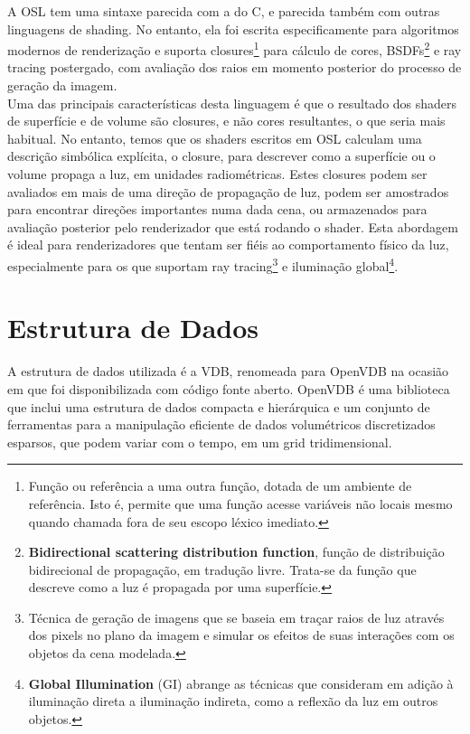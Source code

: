 \documentclass[12pt, a4paper, oneside]{book}
\begin{document}
A OSL tem uma sintaxe parecida com a do C, e parecida também com outras linguagens de shading. No entanto, ela foi escrita especificamente para algoritmos modernos de renderização e suporta closures\footnote{Função ou referência a uma outra função, dotada de um ambiente de referência. Isto é, permite que uma função acesse variáveis não locais mesmo quando chamada fora de seu escopo léxico imediato.} para cálculo de cores, BSDFs\footnote{{\bf Bidirectional scattering distribution function}, função de distribuição bidirecional de propagação, em tradução livre. Trata-se da função que descreve como a luz é propagada por uma superfície.} e ray tracing postergado, com avaliação dos raios em momento posterior do processo de geração da imagem. \\

Uma das principais características desta linguagem é que o resultado dos shaders de superfície e de volume são closures, e não cores resultantes, o que seria mais habitual.
No entanto, temos que os shaders escritos em OSL calculam uma descrição simbólica explícita, o closure, para descrever como a superfície ou o volume propaga a luz, em unidades radiométricas. Estes closures podem ser avaliados em mais de uma direção de propagação de luz, podem ser amostrados para encontrar direções importantes numa dada cena, ou armazenados para avaliação posterior pelo renderizador que está rodando o shader. Esta abordagem é ideal para renderizadores que tentam ser fiéis ao comportamento físico da luz, especialmente para os que suportam ray tracing\footnote{Técnica de geração de imagens que se baseia em traçar raios de luz através dos pixels no plano da imagem e simular os efeitos de suas interações com os objetos da cena modelada.} e iluminação global\footnote{{\bf Global Illumination} (GI) abrange as técnicas que consideram em adição à iluminação direta a iluminação indireta, como a reflexão da luz em outros objetos.}.





%
%

\chapter{Estrutura de Dados}
\label{data_struct}
A estrutura de dados utilizada é a VDB, renomeada para OpenVDB na ocasião em que foi disponibilizada com código fonte aberto. OpenVDB é uma biblioteca que inclui uma estrutura de dados compacta e hierárquica e um conjunto de ferramentas para a manipulação eficiente de dados volumétricos discretizados esparsos, que podem variar com o tempo, em um grid tridimensional. \\
\end{document}
